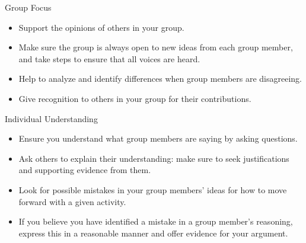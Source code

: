 \documentclass[oneside,letterpaper,11pt]{exam}
\begin{document}
\newpage

\begin{center}
	\vspace{5pt}
	{Group Focus}
	\vspace{5pt}
\end{center}

\begin{itemize}
\item[] Support the opinions of others in your group.\\[-15pt]
\item[] Make sure the group is always open to new ideas from each group member, and take steps to ensure that all voices are heard.\\[-15pt]
\item[] Help to analyze and identify differences when group members are disagreeing.\\[-15pt]
\item[] Give recognition to others in your group for their contributions.
\end{itemize}



\begin{center}
	\vspace{5pt}
	{Individual Understanding}
	\vspace{5pt}
\end{center}

\begin{itemize}
\item[] Ensure you understand what group members are saying by asking questions.\\[-15pt]
\item[] Ask others to explain their understanding: make sure to seek justifications and supporting evidence from them.\\[-15pt]
\item[] Look for possible mistakes in your group members' ideas for how to move forward with a given activity.\\[-15pt]
\item[] If you believe you have identified a mistake in a group member's reasoning, express this in a reasonable manner and offer evidence for your argument.
\end{itemize}
\end{document}
